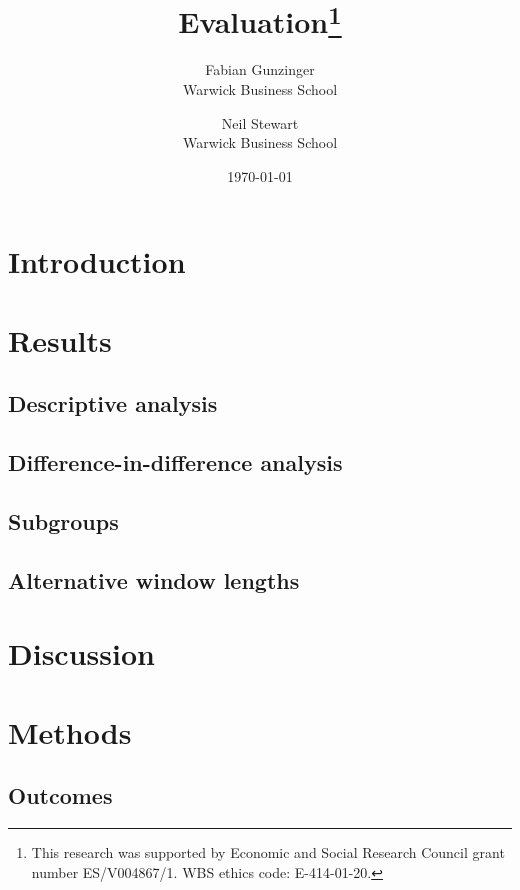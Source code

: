 \documentclass[a4paper, 11pt]{article}
\title{\textbf{Evaluation\footnote{This research was supported by Economic and Social Research Council grant number ES/V004867/1. WBS ethics code: E-414-01-20.}}}
\author{
    Fabian Gunzinger \\ Warwick Business School
    \and
    Neil Stewart \\ Warwick Business School
}
\date{\today}
\begin{document}
\maketitle
% 

\tableofcontents
\newpage

% 
\section{Introduction}%
\label{sec:introduction}


% 
\section{Results}%
\label{sec:results}

\subsection{Descriptive analysis}%
\label{sub:descriptive_analysis}


\subsection{Difference-in-difference analysis}%
\label{sub:difference_in_difference_analysis}

\subsection{Subgroups}%
\label{sub:subgroups}


\subsection{Alternative window lengths}%
\label{sub:alternative_window_lengths}


% 
\section{Discussion}%
\label{sec:discussion}



% 
\section{Methods}%
\label{sec:data}

\subsection{Outcomes}%
\label{sub:outcomes}
\end{document}
